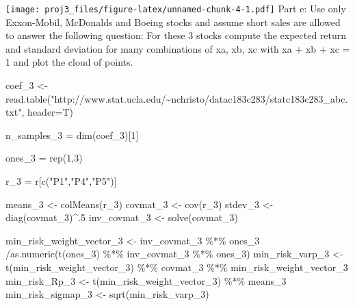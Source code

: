 \documentclass[
]{article}
\newenvironment{Shaded}{\begin{snugshade}}{\end{snugshade}}
\newcommand{\AttributeTok}[1]{\textcolor[rgb]{0.77,0.63,0.00}{#1}}
\newcommand{\DecValTok}[1]{\textcolor[rgb]{0.00,0.00,0.81}{#1}}
\newcommand{\FunctionTok}[1]{\textcolor[rgb]{0.00,0.00,0.00}{#1}}
\newcommand{\NormalTok}[1]{#1}
\newcommand{\OtherTok}[1]{\textcolor[rgb]{0.56,0.35,0.01}{#1}}
\newcommand{\SpecialCharTok}[1]{\textcolor[rgb]{0.00,0.00,0.00}{#1}}
\newcommand{\StringTok}[1]{\textcolor[rgb]{0.31,0.60,0.02}{#1}}
\begin{document}
\texttt{[image: proj3\_files/figure-latex/unnamed-chunk-4-1.pdf]} Part e:
Use only Exxon-Mobil, McDonalds and Boeing stocks and assume short sales
are allowed to answer the following question: For these 3 stocks compute
the expected return and standard deviation for many combinations of xa,
xb, xc with xa + xb + xc = 1 and plot the cloud of points.

\begin{Shaded}
\begin{Highlighting}[]
\NormalTok{coef\_3 }\OtherTok{\textless{}{-}} \FunctionTok{read.table}\NormalTok{(}\StringTok{"http://www.stat.ucla.edu/\textasciitilde{}nchristo/datac183c283/statc183c283\_abc.txt"}\NormalTok{, }\AttributeTok{header=}\NormalTok{T)}

\NormalTok{n\_samples\_3 }\OtherTok{=} \FunctionTok{dim}\NormalTok{(coef\_3)[}\DecValTok{1}\NormalTok{]}

\NormalTok{ones\_3 }\OtherTok{=} \FunctionTok{rep}\NormalTok{(}\DecValTok{1}\NormalTok{,}\DecValTok{3}\NormalTok{)}

\NormalTok{r\_3 }\OtherTok{=}\NormalTok{ r[}\FunctionTok{c}\NormalTok{(}\StringTok{"P1"}\NormalTok{,}\StringTok{"P4"}\NormalTok{,}\StringTok{"P5"}\NormalTok{)]}

\NormalTok{means\_3 }\OtherTok{\textless{}{-}} \FunctionTok{colMeans}\NormalTok{(r\_3)}
\NormalTok{covmat\_3 }\OtherTok{\textless{}{-}} \FunctionTok{cov}\NormalTok{(r\_3)}
\NormalTok{stdev\_3 }\OtherTok{\textless{}{-}} \FunctionTok{diag}\NormalTok{(covmat\_3)}\SpecialCharTok{\^{}}\NormalTok{.}\DecValTok{5}
\NormalTok{inv\_covmat\_3 }\OtherTok{\textless{}{-}} \FunctionTok{solve}\NormalTok{(covmat\_3)}

\NormalTok{min\_risk\_weight\_vector\_3 }\OtherTok{\textless{}{-}}\NormalTok{ inv\_covmat\_3  }\SpecialCharTok{\%*\%}\NormalTok{ ones\_3 }\SpecialCharTok{/}\FunctionTok{as.numeric}\NormalTok{(}\FunctionTok{t}\NormalTok{(ones\_3)  }\SpecialCharTok{\%*\%}\NormalTok{  inv\_covmat\_3 }\SpecialCharTok{\%*\%}\NormalTok{ ones\_3) }
\NormalTok{min\_risk\_varp\_3 }\OtherTok{\textless{}{-}} \FunctionTok{t}\NormalTok{(min\_risk\_weight\_vector\_3) }\SpecialCharTok{\%*\%}\NormalTok{ covmat\_3 }\SpecialCharTok{\%*\%}\NormalTok{ min\_risk\_weight\_vector\_3 }
\NormalTok{min\_risk\_Rp\_3 }\OtherTok{\textless{}{-}} \FunctionTok{t}\NormalTok{(min\_risk\_weight\_vector\_3) }\SpecialCharTok{\%*\%}\NormalTok{ means\_3 }
\NormalTok{min\_risk\_sigmap\_3 }\OtherTok{\textless{}{-}} \FunctionTok{sqrt}\NormalTok{(min\_risk\_varp\_3)}


\end{Highlighting}
\end{Shaded}
\end{document}

